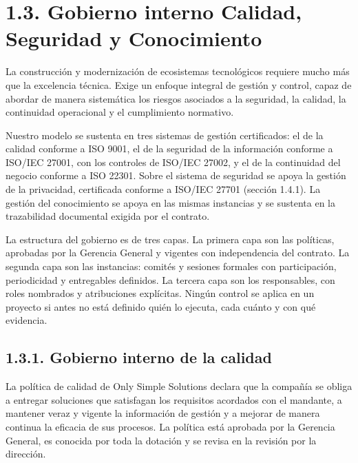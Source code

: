 \documentclass[11pt]{article}
\begin{document}
\section{1.3. Gobierno interno Calidad, Seguridad y Conocimiento}\label{gobierno-interno-calidad-seguridad-y-conocimiento}

La construcción y modernización de ecosistemas tecnológicos requiere mucho más que la excelencia técnica. Exige un enfoque integral de gestión y control, capaz de abordar de manera sistemática los riesgos asociados a la seguridad, la calidad, la continuidad operacional y el cumplimiento normativo.

Nuestro modelo se sustenta en tres sistemas de gestión certificados: el de la calidad conforme a ISO 9001, el de la seguridad de la información conforme a ISO/IEC 27001, con los controles de ISO/IEC 27002, y el de la continuidad del negocio conforme a ISO 22301. Sobre el sistema de seguridad se apoya la gestión de la privacidad, certificada conforme a ISO/IEC 27701 (sección 1.4.1). La gestión del conocimiento se apoya en las mismas instancias y se sustenta en la trazabilidad documental exigida por el contrato.

La estructura del gobierno es de tres capas. La primera capa son las políticas, aprobadas por la Gerencia General y vigentes con independencia del contrato. La segunda capa son las instancias: comités y sesiones formales con participación, periodicidad y entregables definidos. La tercera capa son los responsables, con roles nombrados y atribuciones explícitas. Ningún control se aplica en un proyecto si antes no está definido quién lo ejecuta, cada cuánto y con qué evidencia.

\subsection{1.3.1. Gobierno interno de la calidad}\label{gobierno-interno-de-la-calidad}

La política de calidad de Only Simple Solutions declara que la compañía se obliga a entregar soluciones que satisfagan los requisitos acordados con el mandante, a mantener veraz y vigente la información de gestión y a mejorar de manera continua la eficacia de sus procesos. La política está aprobada por la Gerencia General, es conocida por toda la dotación y se revisa en la revisión por la dirección.
\end{document}
